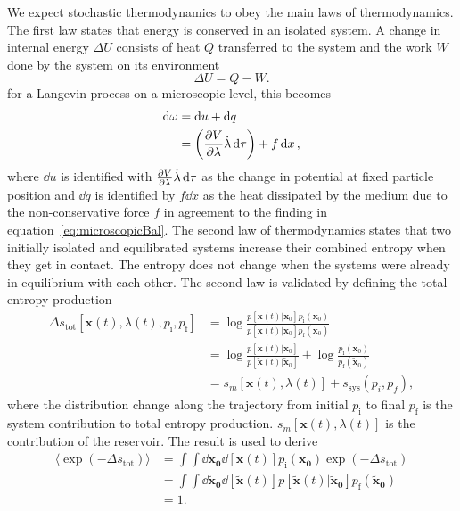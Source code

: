 We expect stochastic thermodynamics to obey the main laws of thermodynamics. The first law states that energy is conserved in an isolated system. A change in internal energy $\Delta U$ consists of heat $Q$ transferred to the system and the work $W$ done by the system on its environment  
\begin{equation}
\Delta U = Q-W .
\end{equation}
for a Langevin process on a microscopic level, this becomes~\cite{sekimoto1998langevin}
\begin{equation}
 \begin{aligned}
  \dd \omega &= \dd u + \dd q\\
             &= \left ( \pdv{V}{\lambda} \dot \lambda \dd{\tau}  \right) + f \dd{x},
  \end{aligned}
  \label{eq:1stlaw}
\end{equation}
where $\dd u$ is identified with $ \pdv{V}{\lambda} \dot \lambda \dd{\tau} $ as the change in potential at fixed particle position and $\dd q$ is identified by $f \dd{x}$ as the heat dissipated by the medium due to the non-conservative force $f$ in agreement to the finding in equation~\ref{eq:microscopicBal}. The second law of thermodynamics states that two initially isolated and equilibrated systems increase their combined entropy when they get in contact. The entropy does not change when the systems were already in equilibrium with each other. 
The second law is validated by defining the total entropy production 
\begin{equation}
\begin{aligned}
 \Delta s_{\text{tot}} [\mathbf{x}(t),\lambda(t),p_{\text{i}},p_{\text{f}}  ] &= \log \frac{p [\mathbf{x}(t) | \mathbf{x}_0] p_{\text{i}}(\mathbf{x}_0)}{p [ \mathbf{\tilde x}(t) | \mathbf{ \tilde x}_0] p_{\text{f}}(\mathbf{ \tilde x}_0)}\\
 &= \log \frac{p [\mathbf{x}(t) | \mathbf{x}_0] }{p [\mathbf{ \tilde x}(t) | \mathbf{ \tilde x}_0] } + \log \frac{p_{\text{i}}( \mathbf{x}_0)}{p_{\text{f}}(\mathbf{\tilde x}_0)}\\
 &= s_m[\mathbf{x}(t),\lambda(t)] + s_{\text{sys}}(p_i,p_f) ,
\end{aligned}
\label{eq:Stot}
\end{equation}
where the distribution change along the trajectory from initial $p_{\text{i}}$ to final $p_{\text{f}}$ is the system contribution to total entropy production. $s_m[\mathbf{x}(t),\lambda(t)]$ is the contribution of the reservoir.  The result is used to derive
\begin{equation}
\begin{aligned}
 \langle \exp \left ( - \Delta s_{\text{tot}} \right ) \rangle &=
 \int \int \dd{\mathbf{x_0}} \dd{[\mathbf{x}( t)]} p_{\text{i}}(\mathbf{x_0}) \exp \left (- \Delta s_{\text{tot}} \right )\\
 &=\int \int \dd{\mathbf{\tilde x_0}} \dd{[\mathbf{ \tilde x}( t)]} p [\mathbf{\tilde x}(t) | \mathbf{\tilde x_0}] p_{\text{f}}( \mathbf{ \tilde x_0})\\
 &= 1 .
\end{aligned}
\label{eq:IFR}
\end{equation}
